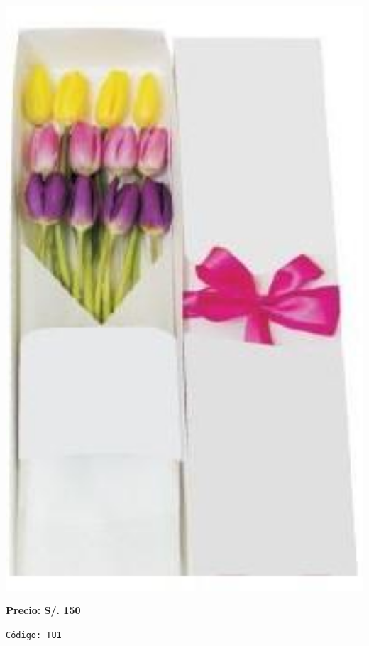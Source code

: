 \documentclass[12pt]{article}
\begin{document}
\begin{minipage}{0.35\textwidth}
    \includegraphics[width=1.0\textwidth]{imagenes_extraidas/image_2_3}
\end{minipage}
\vspace{0.3cm}
\begin{center}
   \textbf{\Large Precio: \textcolor[HTML]{228B22}{S/. 150 }}
\end{center}
\begin{center}
    \textcolor[HTML]{191970}{\texttt{Código: TU1}}
\end{center}
\vspace{1cm}
\noindent
\end{document}
